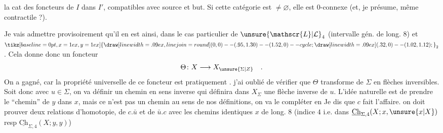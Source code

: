 la cat des foncteurs de $I$ dans $I'$, compatibles
avec source et but. Si cette catégorie est $\ne\varnothing$,
elle est $0$-connexe (et, je présume, même
contractile ?).

Je vais admettre provisoirement qu'il en est ainsi,
 dans le cas particulier de $\unsure{\mathscr{L}|\mathcal{L}}_4$ (intervalle gén. de long. $8$)
et $\mathord{\tikz[baseline=0pt,x=1ex,y=1ex]{\draw[line width=.09ex,line join=round] (0,0) -- (.95,1.30) -- (1.52,0) -- cycle; \draw[line width=.09ex] (.32,0) -- (1.02,1.12);}}_2$. Cela donne donc un foncteur
\[
\Theta\colon X\longrightarrow X_{\unsure{\Sigma|Z}}\quad .
\]
On a gagné, car la propriété universelle de ce
foncteur est pratiquement .   j'ai
oublié de vérifier que $\Theta$ transforme   de $\Sigma$
en flèches inversibles. Soit donc
avec $u\in\Sigma$, on va définir un chemin en sens
inverse
qui définira dans $X_\Sigma$ une flèche inverse de $u$.
L'idée naturelle est de prendre le ``chemin''
de $y$ dans $x$, mais ce n'est pas un chemin au sens
de nos définitions, on va le compléter en
Je dis que $c$ fait l'affaire. on doit prouver
deux relations d'homotopie, de  $c.\bar{u}$ et
de $\bar{u}.c$ avec les chemins identiques  $x$ de long.
$8$ (indice $4$ i.e. dans $\underline{\mathrm{Ch}}_{\Sigma,4}(X;x,\unsure{x|X})$ resp $\underline{\mathrm{Ch}}_{\Sigma,4}(X;y,y)$)
